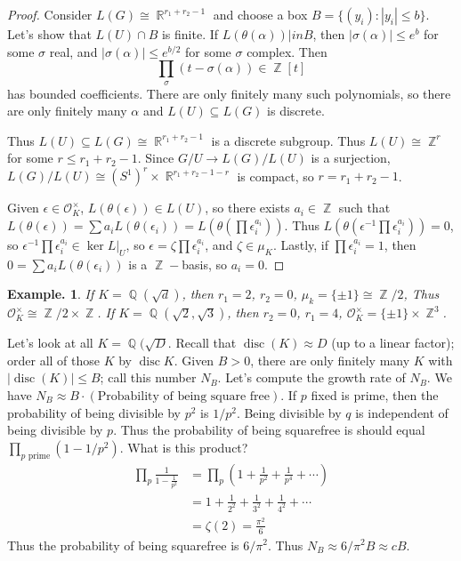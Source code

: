 \documentclass[11pt, a4paper]{memoir}
\DeclareMathOperator{\Q}{{\mathbb{Q}}}
\DeclareMathOperator{\Z}{{\mathbb{Z}}}
\DeclareMathOperator{\R}{{\mathbb{R}}}
\theoremstyle{change}
\theoremstyle{plain}
\theoremstyle{nonumberplain}
\newtheorem{example}{Example.}
\newtheorem{proof}{Proof}
\DeclareMathOperator{\disc}{disc}
\begin{document}
\begin{proof}
    Consider $L(G)\cong\R^{r_1+r_2-1}$ and choose a box $B=\{(y_i):|y_i|\leq b\}$.
    Let's show that $L(U)\cap B$ is finite.
    If $L(\theta(\alpha))|in B$, then $|\sigma(\alpha)|\leq e^b$ for some $\sigma$ real, and $|\sigma(\alpha)|\leq e^{b/2}$ for some $\sigma$ complex.
    Then
    \begin{equation*}
        \prod_\sigma(t-\sigma(\alpha))\in\Z[t]
    \end{equation*}
    has bounded coefficients.
    There are only finitely many such polynomials, so there are only finitely many $\alpha$ and $L(U)\subseteq L(G)$ is discrete.
    
    Thus $L(U)\subseteq L(G)\cong\R^{r_1+r_2-1}$ is a discrete subgroup.
    Thus $L(U)\cong\Z^r$ for some $r\leq r_1+r_2-1$.
    Since $G/U\to L(G)/L(U)$ is a surjection, $L(G)/L(U)\cong (S^1)^r\times\R^{r_1+r_2-1-r}$ is compact, so $r=r_1+r_2-1$.

    Given $\epsilon\in\mathcal{O}_K^\times$, $L(\theta(\epsilon))\in L(U)$, so there exists $a_i\in\Z$ such that $L(\theta(\epsilon))=\sum a_iL(\theta(\epsilon_i))=L(\theta(\prod\epsilon_i^{a_i}))$.
    Thus $L(\theta(\epsilon^{-1}\prod\epsilon_i^{a_i}))=0$, so $\epsilon^{-1}\prod\epsilon_i^{a_i}\in\ker L|_U$, so $\epsilon=\zeta\prod\epsilon_i^{a_i}$, and $\zeta\in\mu_K$.
    Lastly, if $\prod\epsilon_i^{a_i}=1$, then $0=\sum a_iL(\theta(\epsilon_i))$ is a $\Z-$basis, so $a_i=0$.
\end{proof}
\begin{example}
    If $K=\Q(\sqrt{d})$, then $r_1=2$, $r_2=0$, $\mu_k=\{\pm 1\}\cong\Z/2$, Thus $\mathcal{O}_K^\times\cong\Z/2\times\Z$.
    If $K=\Q(\sqrt{2},\sqrt{3})$, then $r_2=0$, $r_1=4$, $\mathcal{O}_K^\times=\{\pm 1\}\times\Z^3$.
\end{example}
Let's look at all $K=\Q(\sqrt{D}$.
Recall that $\disc(K)\approx D$ (up to a linear factor); order all of those $K$ by $\disc K$.
Given $B>0$, there are only finitely many $K$ with $|\disc(K)|\leq B$; call this number $N_B$.
Let's compute the growth rate of $N_B$.
We have $N_B\approx B\cdot(\text{Probability of being square free})$.
If $p$ fixed is prime, then the probability of being divisible by $p^2$ is $1/p^2$.
Being divisible by $q$ is independent of being divisible by $p$.
Thus the probability of being squarefree is should equal $\prod_{p\text{ prime}}(1-1/p^2)$.
What is this product?
\begin{align*}
    \prod_p\frac{1}{1-\frac{1}{p^2}} &= \prod_p\left(1+\frac{1}{p^2}+\frac{1}{p^4}+\cdots\right)\\
                                     &= 1+\frac{1}{2^2}+\frac{1}{3^2}+\frac{1}{4^2}+\cdots\\
                                     &= \zeta(2)=\frac{\pi^2}{6}
\end{align*}
Thus the probability of being squarefree is $6/\pi^2$.
Thus $N_B\approx 6/\pi^2 B\approx cB$.
\end{document}

